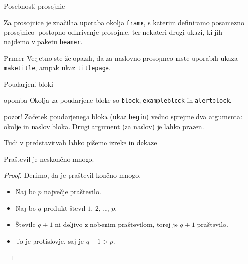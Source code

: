 \begin{frame}{Posebnosti prosojnic}

	Za prosojnice je značilna uporaba okolja \texttt{frame},
	s katerim definiramo posamezno prosojnico,
	\pause
	postopno odkrivanje prosojnic,
	\pause
	ter nekateri drugi ukazi, ki jih najdemo v paketu \texttt{beamer}.
	\pause
	\begin{exampleblock}{Primer}
		Verjetno ste že opazili, da za naslovno prosojnico niste uporabili
		ukaza \texttt{maketitle}, ampak ukaz \texttt{titlepage}.
	\end{exampleblock}
\end{frame}

\begin{frame}{Poudarjeni bloki}
\begin{block}{opomba}
		Okolja za poudarjene bloke so \texttt{block}, \texttt{exampleblock} in \texttt{alertblock}.
\end{block}
\begin{alertblock}{pozor!}
		Začetek poudarjenega bloka (ukaz \texttt{begin}) vedno sprejme 
		dva argumenta: okolje in naslov bloka.
		Drugi argument (za naslov) je lahko prazen. 
\end{alertblock}

\end{frame}

\begin{frame}{Tudi v predstavitvah lahko pišemo izreke in dokaze}

	\begin{izrek}
	   Praštevil je neskončno mnogo.
	\end{izrek}
	\begin{proof}
	   Denimo, da je praštevil končno mnogo.
	   \begin{itemize}[<+->]
		  \item Naj bo \(p\) \alert<4>{največje} praštevilo.
		  \item Naj bo \(q\) produkt števil \(1\), \(2\), \ldots, \(p\).
		  \item Število \(q+1\) ni deljivo z nobenim praštevilom, torej je \(q+1\) praštevilo.
		  \item To je protislovje, saj je \(q+1>p\). \qedhere
	   \end{itemize}
	\end{proof}
 \end{frame}
 
